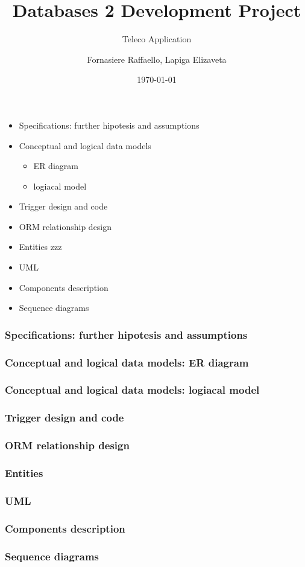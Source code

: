 \documentclass{beamer}
\title{Databases 2 Development Project}
\subtitle{Teleco Application}
\author{Fornasiere Raffaello, Lapiga Elizaveta}
\date{\today}
\begin{document}
\begin{frame}
    \maketitle
\end{frame}

\begin{frame}
    \begin{itemize}
        \item Specifications: further hipotesis and assumptions
        \item Conceptual and logical data models
            \begin{itemize}
                \item ER diagram
                \item logiacal model
            \end{itemize}
        \item Trigger design and code
        \item ORM relationship design
        \item Entities zzz
        \item UML
        \item Components description
        \item Sequence diagrams
    \end{itemize}
\end{frame}

\begin{frame}
    \frametitle{Specifications: further hipotesis and assumptions}

\end{frame}

\begin{frame}
    \frametitle{Conceptual and logical data models: ER diagram}
\end{frame}

\begin{frame}
    \frametitle{Conceptual and logical data models: logiacal model}
\end{frame}

\begin{frame}
    \frametitle{Trigger design and code}
\end{frame}

\begin{frame}
    \frametitle{ORM relationship design}
\end{frame}

\begin{frame}
    \frametitle{Entities}
\end{frame}

\begin{frame}
    \frametitle{UML}
\end{frame}

\begin{frame}
    \frametitle{Components description}
\end{frame}

\begin{frame}
    \frametitle{Sequence diagrams}
\end{frame}
\end{document}
